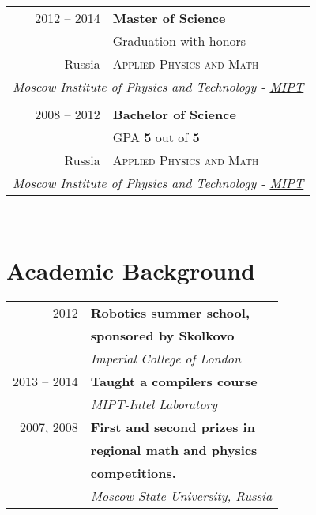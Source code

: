 \documentclass[10pt]{article} %
\begin{document}
\begin{minipage}[h]{0.44\textwidth}
\begin{tabular}{rl}
2012 -- 2014 & \textbf{Master of Science} \\ 
& \small Graduation with honors \\
Russia & \textsc{Applied Physics and Math} \\ 
\multicolumn{2}{c}{ \textit{Moscow Institute of Physics and Technology - \href{http://mipt.ru/en/}{MIPT}}}\\
&\\


2008 -- 2012 & \textbf{Bachelor of Science} \\ 
& \small GPA {\bf 5} out of {\bf 5} \\
Russia & \textsc{Applied Physics and Math} \\ 
\multicolumn{2}{c}{\textit{Moscow Institute of Physics and Technology - \href{http://mipt.ru/en/}{MIPT}}}
	

\end{tabular}\\[10pt]


\section{Academic Background} 

\begin{tabular}{rl}
2012         & \textbf{Robotics summer school,} \\
             & \textbf{sponsored by Skolkovo}\\
& \textit{Imperial College of London}\\


2013 -- 2014 & \textbf{Taught a compilers course}\\
& \textit{MIPT-Intel Laboratory}\\


2007, 2008   & \textbf{First and second prizes in}\\
             & \textbf{regional math and physics}\\
             & \textbf{competitions.}\\
& \textit{Moscow State University, Russia}
\end{tabular}\\[10pt]


\end{minipage}
\end{document}
